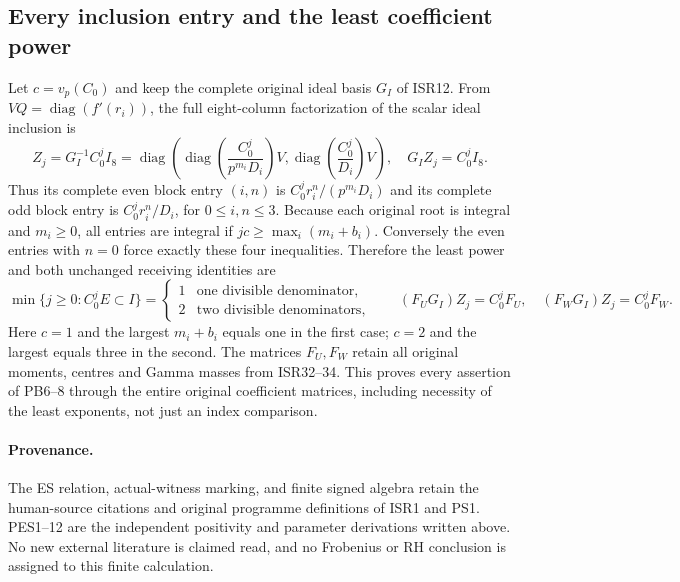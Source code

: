 \documentclass[11pt]{article}
\begin{document}
\subsection{Every inclusion entry and the least coefficient power}
Let $c=v_p(C_0)$ and keep the complete original ideal basis $G_I$ of
ISR12. From $VQ=\operatorname{diag}(f'(r_i))$, the full eight-column
factorization of the scalar ideal inclusion is
\begin{equation}
 Z_j=G_I^{-1}C_0^j I_8
   =\operatorname{diag}\left(
       \operatorname{diag}\left(\frac{C_0^j}{p^{m_i}D_i}\right)V,
       \operatorname{diag}\left(\frac{C_0^j}{D_i}\right)V\right),
 \quad G_IZ_j=C_0^jI_8.                                \tag{PES11}
\end{equation}
Thus its complete even block entry $(i,n)$ is
$C_0^j r_i^n/(p^{m_i}D_i)$ and its complete odd block entry is
$C_0^j r_i^n/D_i$, for $0\le i,n\le3$. Because each original root
is integral and $m_i\ge0$, all entries are integral if
$jc\ge\max_i(m_i+b_i)$. Conversely the even entries with $n=0$
force exactly these four inequalities. Therefore the least power
and both unchanged receiving identities are
\begin{equation}
 \min\{j\ge0:C_0^jE\subset I\}
  =\begin{cases}1&\text{one divisible denominator},\\
                 2&\text{two divisible denominators},\end{cases}
 \qquad (F_U G_I)Z_j=C_0^jF_U,\quad
        (F_W G_I)Z_j=C_0^jF_W.                          \tag{PES12}
\end{equation}
Here $c=1$ and the largest $m_i+b_i$ equals one in the first case;
$c=2$ and the largest equals three in the second. The matrices
$F_U,F_W$ retain all original moments, centres and Gamma masses
from ISR32--34. This proves every assertion of PB6--8 through the
entire original coefficient matrices, including necessity of the
least exponents, not just an index comparison.

\paragraph{Provenance.}
The ES relation, actual-witness marking, and finite signed algebra
retain the human-source citations and original programme definitions
of ISR1 and PS1. PES1--12 are the independent positivity and parameter
derivations written above. No new external literature is claimed read,
and no Frobenius or RH conclusion is assigned to this finite calculation.
\end{document}
